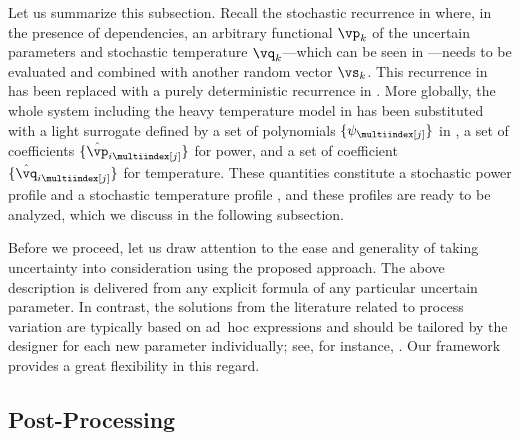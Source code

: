 Let us summarize this subsection. Recall the stochastic recurrence in
 where, in the presence of dependencies, an
arbitrary functional $\vp_k$ of the uncertain parameters \vu and stochastic
temperature $\vq_k$---which can be seen in ---needs to
be evaluated and combined with another random vector $\vs_k$. This recurrence in
 has been replaced with a purely deterministic
recurrence in . More globally, the whole system including
the heavy temperature model in  has been
substituted with a light surrogate defined by a set of polynomials $\{
\psi_{\multiindex[j]} \}$ in \vz, a set of coefficients $\{ \hat{\vp}_{i
\multiindex[j]} \}$ for power, and a set of coefficient $\{ \hat{\vq}_{i
\multiindex[j]} \}$ for temperature. These quantities constitute a stochastic
power profile \mp and a stochastic temperature profile \mq, and these profiles
are ready to be analyzed, which we discuss in the following subsection.

Before we proceed, let us draw attention to the ease and generality of taking
uncertainty into consideration using the proposed approach. The above
description is delivered from any explicit formula of any particular uncertain
parameter. In contrast, the solutions from the literature related to process
variation are typically based on ad~hoc expressions and should be tailored by
the designer for each new parameter individually; see, for instance,
\cite{ghanta2006, bhardwaj2008, huang2009a}. Our framework provides a great
flexibility in this regard.

\subsection{Post-Processing}

